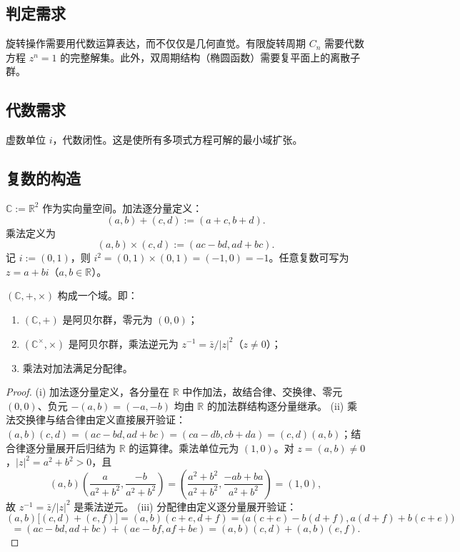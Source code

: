 \subsection{\texorpdfstring{判定需求}{判定需求}}

旋转操作需要用代数运算表达，而不仅仅是几何直觉。有限旋转周期 $C_n$ 需要代数方程 $z^n = 1$ 的完整解集。此外，双周期结构（椭圆函数）需要复平面上的离散子群。

\subsection{\texorpdfstring{代数需求}{代数需求}}

虚数单位 $i$，代数闭性。这是使所有多项式方程可解的最小域扩张。

\subsection{\texorpdfstring{复数的构造}{复数的构造}}

\begin{definition}[复数的构造]\label{def:complex_construction}
$\mathbb{C} := \mathbb{R}^2$ 作为实向量空间。加法逐分量定义：
\[
(a,b) + (c,d) := (a+c, b+d).
\]
乘法定义为
\[
(a,b) \times (c,d) := (ac - bd, ad + bc).
\]
记 $i := (0,1)$，则 $i^2 = (0,1) \times (0,1) = (-1,0) = -1$。任意复数可写为 $z = a + bi$（$a,b \in \mathbb{R}$）。
\end{definition}

\begin{proposition}[复数构成域]\label{prop:complex_algebraically_closed}
$(\mathbb{C},+,\times)$ 构成一个域。即：
\begin{enumerate}[label=(\roman*)]
    \item $(\mathbb{C},+)$ 是阿贝尔群，零元为 $(0,0)$；
    \item $(\mathbb{C}^{\times}, \times)$ 是阿贝尔群，乘法逆元为 $z^{-1} = \bar{z}/|z|^2$（$z \neq 0$）；
    \item 乘法对加法满足分配律。
\end{enumerate}
\end{proposition}

\begin{proof}
(i) 加法逐分量定义，各分量在 $\mathbb{R}$ 中作加法，故结合律、交换律、零元 $(0,0)$、负元 $-(a,b) = (-a,-b)$ 均由 $\mathbb{R}$ 的加法群结构逐分量继承。
(ii) 乘法交换律与结合律由定义直接展开验证：$(a,b)(c,d) = (ac-bd, ad+bc) = (ca-db, cb+da) = (c,d)(a,b)$；结合律逐分量展开后归结为 $\mathbb{R}$ 的运算律。乘法单位元为 $(1,0)$。对 $z = (a,b) \neq 0$，$|z|^2 = a^2+b^2 > 0$，且
\[
(a,b)\left(\frac{a}{a^2+b^2}, \frac{-b}{a^2+b^2}\right) = \left(\frac{a^2+b^2}{a^2+b^2}, \frac{-ab+ba}{a^2+b^2}\right) = (1,0),
\]
故 $z^{-1} = \bar{z}/|z|^2$ 是乘法逆元。
(iii) 分配律由定义逐分量展开验证：
\[
(a,b)\bigl[(c,d)+(e,f)\bigr] = (a,b)(c+e, d+f) = \bigl(a(c+e)-b(d+f), a(d+f)+b(c+e)\bigr)
\]
\[
= (ac-bd, ad+bc) + (ae-bf, af+be) = (a,b)(c,d) + (a,b)(e,f).
\]
\end{proof}

